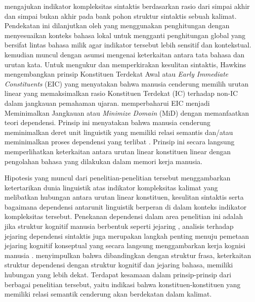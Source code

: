 \cite{miller1963finitary} mengajukan indikator kompleksitas sintaktis berdasarkan rasio dari simpai akhir dan simpai bukan akhir pada bank pohon struktur sintaktis sebuah kalimat. Pendekatan ini dilanjutkan oleh \cite{frazier1985syntactic} yang menggunakan penghitungan dengan menyesuaikan konteks bahasa lokal untuk mengganti penghitungan global yang bersifat lintas bahasa milik \cite{miller1963finitary} agar indikator tersebut lebih sensitif dan kontekstual. \cite{hawkins1994performance} kemudian muncul dengan asumsi mengenai keterkaitan antara tata bahasa dan urutan kata. Untuk mengukur dan memperkirakan kesulitan sintaktis, Hawkins mengembangkan prinsip Konstituen Terdekat Awal atau \textit{Early Immediate Constituents} (EIC) yang menyatakan bahwa manusia cenderung memilih urutan linear yang memaksimalkan rasio Konstituen Terdekat (IC) terhadap non-IC dalam jangkauan pemahaman ujaran. \cite{hawkins2004efficiency} memperbaharui EIC menjadi Meminimalkan Jangkauan atau \textit{Minimize Domain} (MiD) dengan memanfaatkan teori dependensi. Prinsip ini menyatakan bahwa manusia cenderung meminimalkan deret unit linguistik yang memiliki relasi semantis dan/atau meminimalkan proses dependensi yang terlibat \citep{hawkins2004efficiency}. Prinsip ini secara langsung memperlihatkan keterkaitan antara urutan linear konstituen linear dengan pengolahan bahasa yang dilakukan dalam memori kerja manusia.

Hipotesis yang muncul dari penelitian-penelitian tersebut menggambarkan ketertarikan dunia linguistik atas indikator kompleksitas kalimat yang melibatkan hubungan antara urutan linear konstituen, kesulitan sintaktis serta bagaimana dependensi antarunit linguistik berperan di dalam konteks indikator kompleksitas tersebut. Penekanan dependensi dalam area penelitian ini adalah jika struktur kognitif manusia berbentuk seperti jejaring \citep{hudson2007language}, analisis terhadap jejaring dependensi sintaktis juga merupakan langkah penting menuju pemetaan jejaring kognitif konseptual yang secara langsung menggambarkan kerja kognisi manusia \citep{liu2008dependency}. \cite{liu2008dependency} menyimpulkan bahwa dibandingkan dengan struktur frasa, keterkaitan struktur dependensi dengan struktur kognitif dan jejaring bahasa, memiliki hubungan yang lebih dekat. Terdapat kesamaan dalam prinsip-prinsip dari berbagai penelitian tersebut, yaitu indikasi bahwa konstituen-konstituen yang memiliki relasi semantik cenderung akan berdekatan dalam kalimat. 

